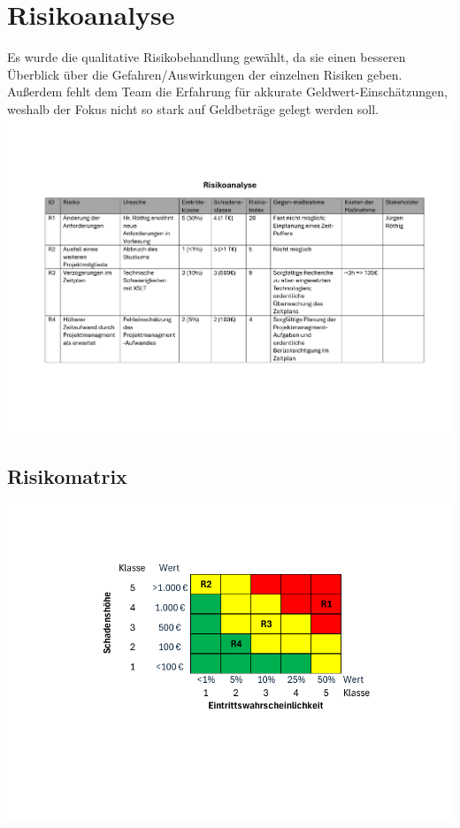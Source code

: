 \documentclass[12pt]{article}
\begin{document}
\section{Risikoanalyse}
Es wurde die qualitative Risikobehandlung gewählt, da sie einen besseren Überblick über die Gefahren/Auswirkungen der einzelnen Risiken geben. Außerdem fehlt dem Team die Erfahrung für akkurate Geldwert-Einschätzungen, weshalb der Fokus nicht so stark auf Geldbeträge gelegt werden soll.
\newline
\includegraphics[width=\textwidth]{Planungsdokumente/graphics/Risikoanalyse.pdf}
\subsection*{Risikomatrix}
\includegraphics[width=\textwidth]{Planungsdokumente/graphics/Risikomatrix.pdf}
\end{document}
